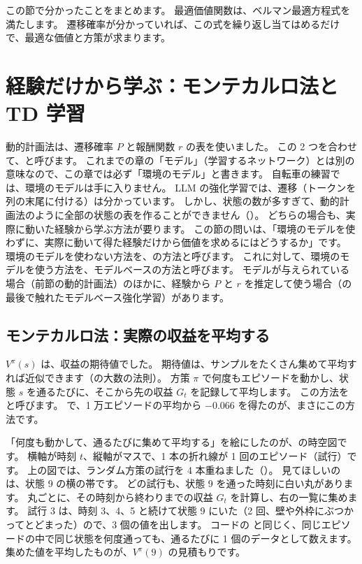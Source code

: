 この節で分かったことをまとめます。
最適価値関数は、ベルマン最適方程式を満たします。
遷移確率が分かっていれば、この式を繰り返し当てはめるだけで、最適な価値と方策が求まります。

\section{経験だけから学ぶ：モンテカルロ法と TD 学習}\label{sec:rlb-mc-td}

動的計画法は、遷移確率 $P$ と報酬関数 $r$ の表を使いました。
この 2 つを合わせて、と呼びます。
これまでの章の「モデル」（学習するネットワーク）とは別の意味なので、この章では必ず「環境のモデル」と書きます。
自転車の練習では、環境のモデルは手に入りません。
LLM の強化学習では、遷移（トークンを列の末尾に付ける）は分かっています。
しかし、状態の数が多すぎて、動的計画法のように全部の状態の表を作ることができません（）。
どちらの場合も、実際に動いた経験から学ぶ方法が要ります。
この節の問いは、「環境のモデルを使わずに、実際に動いて得た経験だけから価値を求めるにはどうするか」です。
環境のモデルを使わない方法を、の方法と呼びます。
これに対して、環境のモデルを使う方法を、モデルベースの方法と呼びます。
モデルが与えられている場合（前節の動的計画法）のほかに、経験から $P$ と $r$ を推定して使う場合（の最後で触れたモデルベース強化学習）があります。

\subsection*{モンテカルロ法：実際の収益を平均する}

$V^\pi(s)$ は、収益の期待値でした。
期待値は、サンプルをたくさん集めて平均すれば近似できます（の大数の法則）。
方策 $\pi$ で何度もエピソードを動かし、状態 $s$ を通るたびに、そこから先の収益 $G_t$ を記録して平均します。
この方法をと呼びます。
で、1 万エピソードの平均から $-0.066$ を得たのが、まさにこの方法です。

「何度も動かして、通るたびに集めて平均する」を絵にしたのが、の時空図です。
横軸が時刻 $t$、縦軸がマスで、1 本の折れ線が 1 回のエピソード（試行）です。
上の図では、ランダム方策の試行を 4 本重ねました（）。
見てほしいのは、状態 9 の横の帯です。
どの試行も、状態 9 を通った時刻に白い丸があります。
丸ごとに、その時刻から終わりまでの収益 $G_t$ を計算し、右の一覧に集めます。
試行 3 は、時刻 3、4、5 と続けて状態 9 にいた（2 回、壁や外枠にぶつかってとどまった）ので、3 個の値を出します。
コードの  と同じく、同じエピソードの中で同じ状態を何度通っても、通るたびに 1 個のデータとして数えます。
集めた値を平均したものが、$V^\pi(9)$ の見積もりです。

